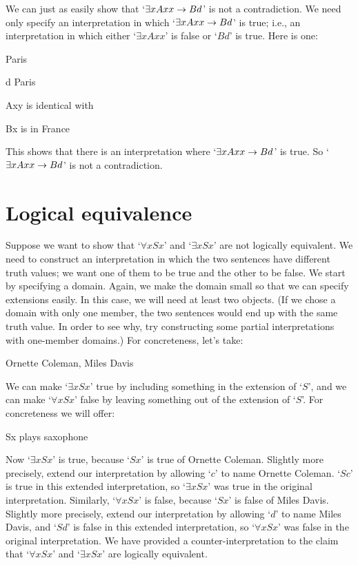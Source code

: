 We can just as easily show that `$\exists xAxx \rightarrow Bd$' is not a contradiction. We need only specify an interpretation in which `$\exists xAxx \rightarrow Bd$' is true; i.e., an interpretation in which either `$\exists x Axx$' is false or `$Bd$' is true. Here is one:
	\begin{ekey}
		\item[\text{domain}] Paris
		\item[d] Paris
		\item[Axy]  is identical with 
		\item[Bx]  is in France
	\end{ekey}
This shows that there is an interpretation where `$\exists xAxx \rightarrow Bd$' is true. So `$\exists x Axx \rightarrow Bd$' is not a contradiction.

\section{Logical equivalence}
Suppose we want to show that `$\forall x Sx$' and `$\exists x Sx$' are not logically equivalent. We need to construct an interpretation in which the two sentences have different truth values; we want one of them to be true and the other to be false. We start by specifying a domain. Again, we make the domain small so that we can specify extensions easily. In this case, we will need at least two objects. (If we chose a domain with only one member, the two sentences would end up with the same truth value. In order to see why, try constructing some partial interpretations with one-member domains.) For concreteness, let's take:
	\begin{ekey}
		\item[\text{domain}] Ornette Coleman, Miles Davis
	\end{ekey}
We can make `$\exists x Sx$' true by including something in the extension of `$S$', and we can make `$\forall x Sx$' false by leaving something out of the extension of `$S$'. For concreteness we will offer:
	\begin{ekey}
		\item[Sx]  plays saxophone
	\end{ekey}
Now `$\exists x Sx$' is true, because `$Sx$' is true of Ornette Coleman. Slightly more precisely, extend our interpretation by allowing `$c$' to name Ornette Coleman.  `$Sc$' is true in this extended interpretation, so `$\exists x Sx$' was true in the original interpretation. Similarly, `$\forall x Sx$' is false, because `$Sx$' is false of Miles Davis. Slightly more precisely, extend our interpretation by allowing `$d$' to name Miles Davis, and `$Sd$' is false in this extended interpretation, so `$\forall x Sx$' was false in the original interpretation. We have provided a counter-interpretation to the claim that `$\forall x Sx$' and `$\exists x Sx$' are logically equivalent.
